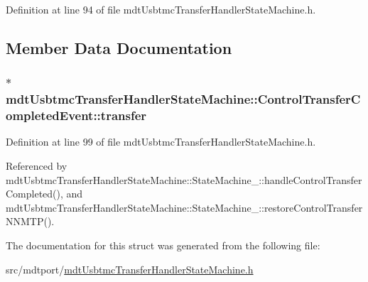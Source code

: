 Definition at line 94 of file mdt\-Usbtmc\-Transfer\-Handler\-State\-Machine.\-h.



\subsection{Member Data Documentation}
\hypertarget{structmdt_usbtmc_transfer_handler_state_machine_1_1_control_transfer_completed_event_a5b4b3eb1cc5a3f381bfd50616a5a9f74}{
\subsubsection[{transfer}]{$\ast$ mdt\-Usbtmc\-Transfer\-Handler\-State\-Machine\-::\-Control\-Transfer\-Completed\-Event\-::transfer}}\label{structmdt_usbtmc_transfer_handler_state_machine_1_1_control_transfer_completed_event_a5b4b3eb1cc5a3f381bfd50616a5a9f74}


Definition at line 99 of file mdt\-Usbtmc\-Transfer\-Handler\-State\-Machine.\-h.



Referenced by mdt\-Usbtmc\-Transfer\-Handler\-State\-Machine\-::\-State\-Machine\-\_\-\-::handle\-Control\-Transfer\-Completed(), and mdt\-Usbtmc\-Transfer\-Handler\-State\-Machine\-::\-State\-Machine\-\_\-\-::restore\-Control\-Transfer\-N\-N\-M\-T\-P().



The documentation for this struct was generated from the following file\-:\begin{DoxyCompactItemize}
\item 
src/mdtport/\hyperlink{mdt_usbtmc_transfer_handler_state_machine_8h}{mdt\-Usbtmc\-Transfer\-Handler\-State\-Machine.\-h}\end{DoxyCompactItemize}
